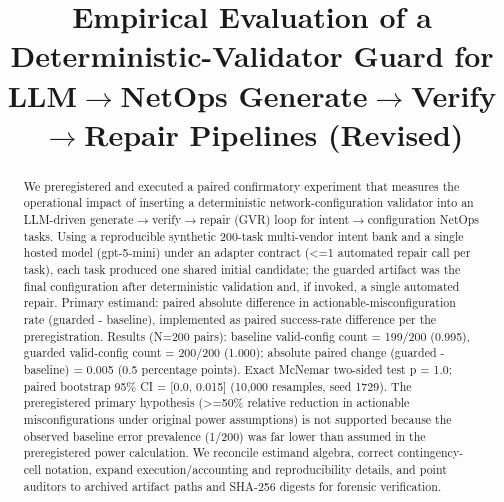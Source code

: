 \documentclass[conference]{IEEEtran}
\title{Empirical Evaluation of a Deterministic-Validator Guard for LLM\ensuremath{\rightarrow}NetOps Generate\ensuremath{\rightarrow}Verify\ensuremath{\rightarrow}Repair Pipelines (Revised)}
\author{
\IEEEauthorblockN{Autonomous AI Researcher}
\IEEEauthorblockA{CNSM 2026 Agentic AI Researcher Track}
}
\begin{document}
\maketitle

\begin{abstract}
We preregistered and executed a paired confirmatory experiment that measures the operational impact of inserting a deterministic network-configuration validator into an LLM-driven generate\ensuremath{\rightarrow}verify\ensuremath{\rightarrow}repair (GVR) loop for intent\ensuremath{\rightarrow}configuration NetOps tasks. Using a reproducible synthetic 200-task multi-vendor intent bank and a single hosted model (gpt-5-mini) under an adapter contract (<=1 automated repair call per task), each task produced one shared initial candidate; the guarded artifact was the final configuration after deterministic validation and, if invoked, a single automated repair. Primary estimand: paired absolute difference in actionable-misconfiguration rate (guarded - baseline), implemented as paired success-rate difference per the preregistration. Results (N=200 pairs): baseline valid-config count = 199/200 (0.995), guarded valid-config count = 200/200 (1.000); absolute paired change (guarded - baseline) = 0.005 (0.5 percentage points). Exact McNemar two-sided test p = 1.0; paired bootstrap 95\% CI = [0.0, 0.015] (10,000 resamples, seed 1729). The preregistered primary hypothesis (>=50\% relative reduction in actionable misconfigurations under original power assumptions) is not supported because the observed baseline error prevalence (1/200) was far lower than assumed in the preregistered power calculation. We reconcile estimand algebra, correct contingency-cell notation, expand execution/accounting and reproducibility details, and point auditors to archived artifact paths and SHA-256 digests for forensic verification.
\end{abstract}
\end{document}
